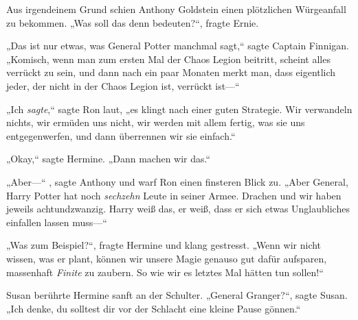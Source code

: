 Aus irgendeinem Grund schien Anthony Goldstein einen plötzlichen Würgeanfall zu bekommen. „Was soll das denn bedeuten?“, fragte Ernie.

„Das ist nur etwas, was General Potter manchmal sagt,“ sagte Captain Finnigan. „Komisch, wenn man zum ersten Mal der Chaos Legion beitritt, scheint alles verrückt zu sein, und dann nach ein paar Monaten merkt man, dass eigentlich jeder, der nicht in der Chaos Legion ist, verrückt ist—“

„Ich \emph{sagte},“ sagte Ron laut, „es klingt nach einer guten Strategie. Wir verwandeln nichts, wir ermüden uns nicht, wir werden mit allem fertig, was sie uns entgegenwerfen, und dann überrennen wir sie einfach.“

„Okay,“ sagte Hermine. „Dann machen wir das.“

„Aber—“ , sagte Anthony und warf Ron einen finsteren Blick zu. „Aber General, Harry Potter hat noch \emph{sechzehn} Leute in seiner Armee. Drachen und wir haben jeweils achtundzwanzig. Harry weiß das, er weiß, dass er sich etwas Unglaubliches einfallen lassen muss—“

„Was zum Beispiel?“, fragte Hermine und klang gestresst. „Wenn wir nicht wissen, was er plant, können wir unsere Magie genauso gut dafür aufsparen, massenhaft \emph{Finite} zu zaubern. So wie wir es letztes Mal hätten tun sollen!“

Susan berührte Hermine sanft an der Schulter. „General Granger?“, sagte Susan. „Ich denke, du solltest dir vor der Schlacht eine kleine Pause gönnen.“

